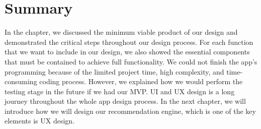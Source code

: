 \section{Summary}
In the chapter, we discussed the minimum viable product of our design and demonstrated the critical steps throughout our design process. 
For each function that we want to include in our design, we also showed the essential components that must be contained to achieve full functionality. 
We could not finish the app's programming because of the limited project time, high complexity, and time-consuming coding process. 
However, we explained how we would perform the testing stage in the future if we had our MVP. UI and UX design is a long journey throughout the whole app design process. 
In the next chapter, we will introduce how we will design our recommendation engine, which is one of the key elements is UX design.

